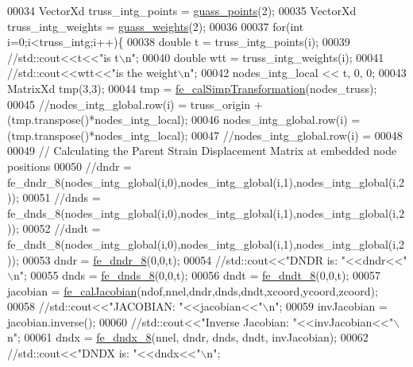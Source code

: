 \begin{DoxyCode}
00034     VectorXd truss\_intg\_points = \hyperlink{functions_8h_aa6ab8c3298fa10734e299fe8266aed35}{guass\_points}(2);
00035     VectorXd truss\_intg\_weights = \hyperlink{functions_8h_a84dcc9575e861bdb2872c10ba6238ee4}{guass\_weights}(2);
00036 
00037     \textcolor{keywordflow}{for}(\textcolor{keywordtype}{int} i=0;i<truss\_intg;i++)\{
00038         \textcolor{keywordtype}{double} t = truss\_intg\_points(i);
00039         \textcolor{comment}{//std::cout<<t<<"is t\(\backslash\)n";}
00040         \textcolor{keywordtype}{double} wtt = truss\_intg\_weights(i);
00041         \textcolor{comment}{//std::cout<<wtt<<"is the weight\(\backslash\)n";    }
00042         nodes\_intg\_local << t, 0, 0;
00043         MatrixXd tmp(3,3);
00044         tmp = \hyperlink{functions_8h_ae2eeba997bf4f0bc4749b92130de7ba3}{fe\_calSimpTransformation}(nodes\_truss);
00045         \textcolor{comment}{//nodes\_intg\_global.row(i) = truss\_origin + (tmp.transpose()*nodes\_intg\_local);}
00046         nodes\_intg\_global.row(i) = (tmp.transpose()*nodes\_intg\_local);
00047         \textcolor{comment}{//nodes\_intg\_global.row(i) = }
00048         
00049         \textcolor{comment}{// Calculating the Parent Strain Displacement Matrix at embedded node positions}
00050         \textcolor{comment}{//dndr = fe\_dndr\_8(nodes\_intg\_global(i,0),nodes\_intg\_global(i,1),nodes\_intg\_global(i,2));}
00051         \textcolor{comment}{//dnds = fe\_dnds\_8(nodes\_intg\_global(i,0),nodes\_intg\_global(i,1),nodes\_intg\_global(i,2));}
00052         \textcolor{comment}{//dndt = fe\_dndt\_8(nodes\_intg\_global(i,0),nodes\_intg\_global(i,1),nodes\_intg\_global(i,2));}
00053         dndr = \hyperlink{functions_8h_afc547bef246c057db6cbd04bf7f866a9}{fe\_dndr\_8}(0,0,t);
00054         \textcolor{comment}{//std::cout<<"DNDR is: "<<dndr<<"\(\backslash\)n";}
00055         dnds = \hyperlink{functions_8h_ac0b5524525e1f2e89bb064c15ab8e664}{fe\_dnds\_8}(0,0,t);
00056         dndt = \hyperlink{functions_8h_a57e8e5c9f740c98e4767f29c121c2d0a}{fe\_dndt\_8}(0,0,t);
00057         jacobian = \hyperlink{functions_8h_a5ae3771e65b4a0d177097041a4349c28}{fe\_calJacobian}(ndof,nnel,dndr,dnds,dndt,xcoord,ycoord,zcoord);
00058         \textcolor{comment}{//std::cout<<"JACOBIAN: "<<jacobian<<"\(\backslash\)n";}
00059                 invJacobian = jacobian.inverse();
00060         \textcolor{comment}{//std::cout<<"Inverse Jacobian: "<<invJacobian<<"\(\backslash\)n";}
00061                 dndx = \hyperlink{functions_8h_afc6be1a5667e68156cb099e8da71170f}{fe\_dndx\_8}(nnel, dndr, dnds, dndt, invJacobian);
00062         \textcolor{comment}{//std::cout<<"DNDX is: "<<dndx<<"\(\backslash\)n";}

\end{DoxyCode}
